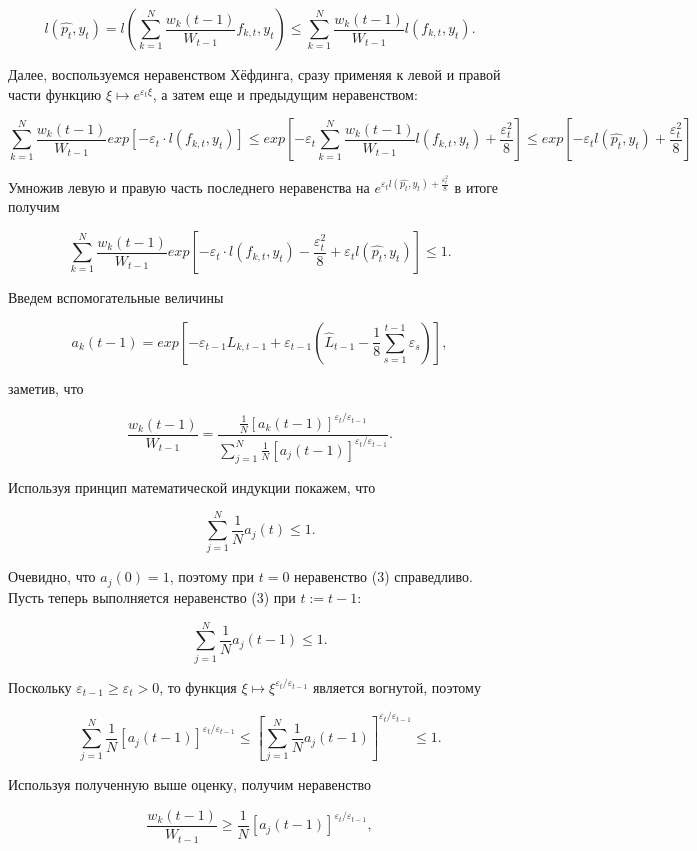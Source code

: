 \documentclass{article}
\begin{document}
\[ 
l(\hat{p_t}, y_t) = l(\sum^N_{k=1} \frac{w_k(t-1)}{W_{t-1}} f_{k,t}, y_t) \le \sum^N_{k=1} \frac{w_k(t-1)}{W_{t-1}} l(f_{k,t}, y_t). 
\]

Далее, воспользуемся неравенством Хёфдинга, сразу применяя к левой и правой части функцию $\xi \mapsto e^{\varepsilon_t \xi}$, а затем еще и предыдущим неравенством:

\[ 
\sum^N_{k=1} \frac{w_k(t-1)}{W_{t-1}} exp[-\varepsilon_t \cdot l(f_{k,t}, y_t)] \le 
exp[ - \varepsilon_t \sum^N_{k=1} \frac{w_k(t-1)}{W_{t-1}} l(f_{k,t}, y_t) + \frac{\varepsilon^2_t}{8} ] \le
exp[-\varepsilon_t l(\hat{p_t}, y_t) + \frac{\varepsilon^2_t}{8}]
\]

Умножив левую и правую часть последнего неравенства на $ e^{\varepsilon_t l(\hat{p_t}, y_t) + \frac{\varepsilon^2_t}{8}}$ в итоге получим

\begin{equation}
\sum^N_{k=1} \frac{w_k(t-1)}{W_{t-1}} exp[-\varepsilon_t \cdot l(f_{k,t}, y_t) - \frac{\varepsilon^2_t}{8} + \varepsilon_t l(\hat{p_t}, y_t) ] \le 1.
\end{equation}

Введем вспомогательные величины

\[  
a_k(t-1) = exp[ -\varepsilon_{t-1} L_{k,t-1} + \varepsilon_{t-1} (\hat{L}_{t-1} - \frac{1}{8} \sum^{t-1}_{s=1} \varepsilon_s)],
\]

заметив, что 

\begin{equation}
\frac{w_k(t-1)}{W_{t-1}} = \frac{ \frac{1}{N} [a_k(t-1)]^{\varepsilon_t / \varepsilon_{t-1}} }{ \sum^N_{j=1} \frac{1}{N} [a_j(t - 1)]^{\varepsilon_t / \varepsilon_{t-1}} }.
\end{equation}

Используя принцип математической индукции покажем, что

\begin{equation}
\sum^N_{j=1} \frac{1}{N} a_j(t) \le 1.
\end{equation}

Очевидно, что $a_j (0) = 1$, поэтому при $t = 0$ неравенство (3) справедливо. Пусть теперь выполняется неравенство (3) при $t := t - 1$:

\[ 
\sum^N_{j=1} \frac{1}{N} a_j(t-1) \le 1.
\]

Поскольку $\varepsilon_{t-1} \ge \varepsilon_t > 0$, то функция $\xi \mapsto \xi^{\varepsilon_t / \varepsilon_{t-1}}$ является вогнутой, поэтому 

\[ 
\sum^N_{j=1} \frac{1}{N} [a_j(t-1)]^{\varepsilon_t / \varepsilon_{t-1}} \le [\sum^N_{j=1} \frac{1}{N} a_j(t-1)]^{\varepsilon_t / \varepsilon_{t-1}} \le 1.
\]

Используя полученную выше оценку, получим неравенство

\[
\frac{w_k(t-1)}{W_{t-1}} \ge \frac{1}{N} [a_j(t-1)]^{\varepsilon_t / \varepsilon_{t-1}},
\]
\end{document}
